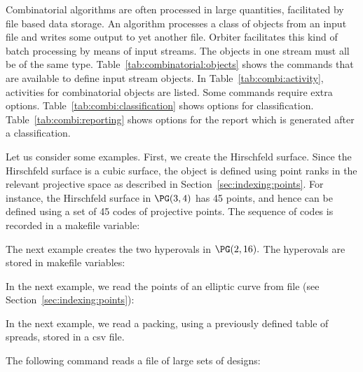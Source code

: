 Combinatorial algorithms are often processed in large quantities, facilitated by file based data storage. 
An algorithm processes a class of objects from an input file and writes some output to yet another file.
Orbiter facilitates this kind of batch processing by means of input streams. 
The objects in one stream must all be of the same type.  
Table~\ref{tab:combinatorial:objects} shows the commands that are available to define input stream objects. 
In Table~\ref{tab:combi:activity}, activities for combinatorial objects are listed.
Some commands require extra options. 
Table~\ref{tab:combi:classification} shows options for classification.
Table~\ref{tab:combi:reporting} shows options for the report which is generated after a classification.

\bigskip

Let us consider some examples. 
First, we create the Hirschfeld surface.
Since the Hirschfeld surface is a cubic surface, 
the object is defined using point ranks in the relevant projective space 
as described in Section~\ref{sec:indexing:points}. 
For instance, the Hirschfeld surface in $\PG(3,4)$ has 45 points, 
and hence can be defined using a set of 45 codes of projective points.
The sequence of codes is recorded in a makefile variable:




The next example creates the two hyperovals in $\PG(2,16).$ 
The hyperovals are stored in makefile variables:






In the next example, we read the points 
of an elliptic curve from file 
(see Section~\ref{sec:indexing:points}):


In the next example, we read a packing, 
using a previously defined table of spreads, 
stored in a csv file.


The following command reads a file of large sets of designs:


